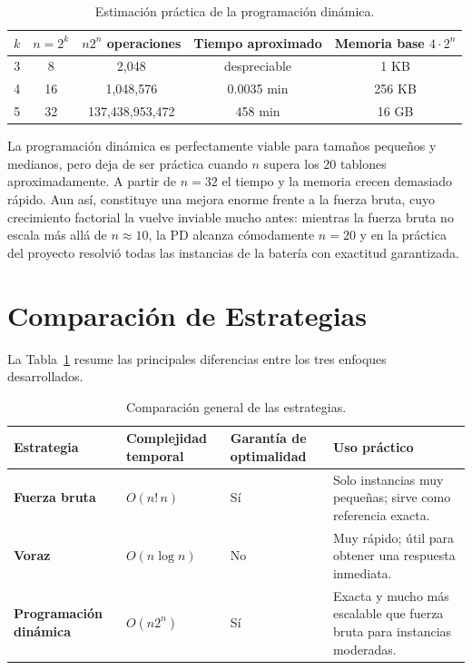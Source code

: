 \documentclass[12pt,a4paper]{article}
\begin{document}
\begin{table}[ht]
  \centering
  \begin{tabular}{ccccc}
    \toprule
    \(k\) & \(n=2^k\) & \(n2^n\) operaciones & Tiempo aproximado & Memoria base \(4 \cdot 2^n\) \\
    \midrule
    3 & 8  & 2,048              & despreciable & 1 KB \\
    4 & 16 & 1,048,576          & 0.0035 min   & 256 KB \\
    5 & 32 & 137,438,953,472    & 458 min      & 16 GB \\
    \bottomrule
  \end{tabular}
  \caption{Estimaci\'on pr\'actica de la programaci\'on din\'amica.}
\end{table}

La programaci\'on din\'amica es perfectamente viable para tama\~nos peque\~nos y medianos, pero deja de ser pr\'actica cuando \(n\) supera los 20 tablones aproximadamente. A partir de \(n=32\) el tiempo y la memoria crecen demasiado r\'apido. Aun as\'i, constituye una mejora enorme frente a la fuerza bruta, cuyo crecimiento factorial la vuelve inviable mucho antes: mientras la fuerza bruta no escala m\'as all\'a de \(n \approx 10\), la PD alcanza c\'omodamente \(n = 20\) y en la pr\'actica del proyecto resolvi\'o todas las instancias de la bater\'ia con exactitud garantizada.

\section{Comparaci\'on de Estrategias}

La Tabla~\ref{tab:comparacion-estrategias} resume las principales diferencias entre los tres enfoques desarrollados.

\begin{table}[ht]
  \centering
  \begin{tabularx}{\textwidth}{>{\bfseries}l>{\centering\arraybackslash}X>{\centering\arraybackslash}X>{\centering\arraybackslash}X}
    \toprule
    Estrategia & Complejidad temporal & Garant\'ia de optimalidad & Uso pr\'actico \\
    \midrule
    Fuerza bruta & \(O(n!\,n)\) & S\'i & Solo instancias muy peque\~nas; sirve como referencia exacta. \\
    Voraz & \(O(n \log n)\) & No & Muy r\'apido; \'util para obtener una respuesta inmediata. \\
    Programaci\'on din\'amica & \(O(n2^n)\) & S\'i & Exacta y mucho m\'as escalable que fuerza bruta para instancias moderadas. \\
    \bottomrule
  \end{tabularx}
  \caption{Comparaci\'on general de las estrategias.}
  \label{tab:comparacion-estrategias}
\end{table}
\end{document}
